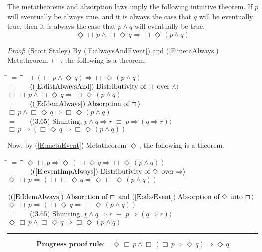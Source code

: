 \documentclass[12pt, fleqn, leqno]{article}
\newcommand{\lgap}{2pt}                             %
\newcommand{\mymathindent}{24pt}                    %
\newcommand{\equivs}{\ensuremath{\;\equiv\;}}       %
\newcommand{\impl}{\ensuremath{\Rightarrow}}        %
\newcommand{\Event}{\Diamond\,}
\newcommand{\Always}{\Box\,}
\newcommand{\myqed}{\rule[-.23ex]{1.2ex}{2.0ex}}
\newcommand{\myqedtab}{\hspace{384pt}}              %
\newcommand{\Gll} {\langle}                         %
\newcommand{\Ggg} {\rangle}                         %
\newcommand{\Hint}[1]     {\ \ \ $\Gll              \mbox{#1} \Ggg$ }   %
\begin{document}
The metatheorems and absorption laws imply the following intuitive theorem.
If $p$ will eventually be always true, and it is always the case that $q$ will be eventually true, then it is always the case that $p\land q$ will eventually be true.
\begin{equation}\label{E:eventAlwaysPAndAlwaysEventQ}
\Event\Always p\land \Always\Event q \impl \Always\Event (p\land q)
\end{equation}

\emph{Proof}: (Scott Staley) By (\ref{E:alwaysAndEvent}) and (\ref{E:metaAlways}) Metatheorem $\Always$, the following is a theorem.
\begin{tabbing}
\hspace{\mymathindent} \= $= \;$ \= \myqedtab \= \kill
\> \>   $\Always (\Always p \land \Event q) \impl \Always\Event (p \land q)$\\[\lgap]
\> $=$  \>  \Hint{(\ref{E:distAlwaysAnd}) Distributivity of $\Always$ over $\land$}\\[\lgap]
\> \>   $\Always \Always p \land \Always\Event q \impl \Always\Event (p \land q)$\\[\lgap]
\> $=$  \>  \Hint{(\ref{E:IdemAlways}) Absorption of $\Always$}\\[\lgap]
\> \>   $\Always p \land \Always\Event q \impl \Always\Event (p \land q)$\\[\lgap]
\> $=$  \>  \Hint{(3.65) Shunting, $p\land q\impl r\equivs p\impl (q\impl r)$}\\[\lgap]
\> \>   $\Always p \impl (\Always\Event q \impl \Always\Event (p \land q))$
\end{tabbing}
Now, by (\ref{E:metaEvent}) Metatheorem $\Event$, the following is a theorem.
\begin{tabbing}
\hspace{\mymathindent} \= $= \;$ \= \myqedtab \= \kill
\> \>   $\Event\Always p \impl \Event(\Always\Event q \impl \Always\Event (p \land q))$\\[\lgap]
\> $=$  \>  \Hint{(\ref{E:eventImpAlways}) Distributivity of $\Event$ over $\impl$}\\[\lgap]
\> \>   $\Event\Always p \impl (\Always\Always\Event q \impl \Event\Always\Event (p \land q))$\\[\lgap]
\> $=$  \>  \Hint{(\ref{E:IdemAlways}) Absorption of $\Always$ and (\ref{E:absEvent}) Absorption of $\Event$ into $\Always$}\\[\lgap]
\> \>   $\Event\Always p \impl (\Always\Event q \impl \Always\Event (p \land q))$\\[\lgap]
\> $=$  \>  \Hint{(3.65) Shunting, $p\land q\impl r\equivs p\impl (q\impl r)$}\\[\lgap]
\> \>   $\Event\Always p\land \Always\Event q \impl \Always\Event (p\land q)$ \quad \myqed
\end{tabbing}
\begin{equation}\label{E:PrProofRule}
\textbf{Progress proof rule:}\quad \Event\Always p \land \Always(\Always p \impl \Event q) \impl \Event q
\end{equation}
\end{document}
